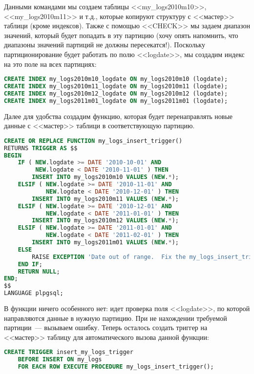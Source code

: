Данными командами мы создаем таблицы <<my\_logs2010m10>>, <<my\_logs2010m11>> и т.д., которые копируют структуру с <<мастер>> 
таблици (кроме индексов). Также с помощью <<CHECK>> мы задаем диапазон значений, который будет попадать в эту партицию 
(хочу опять напомнить, что диапазоны значений партиций не должны пересекатся!). Поскольку партиционирование будет работать 
по полю <<logdate>>, мы создадим индекс на это поле на всех партициях:
\begin{lstlisting}[language=SQL,label=lst:partitioning4,caption=Создание индексов]
CREATE INDEX my_logs2010m10_logdate ON my_logs2010m10 (logdate);
CREATE INDEX my_logs2010m11_logdate ON my_logs2010m11 (logdate);
CREATE INDEX my_logs2010m12_logdate ON my_logs2010m12 (logdate);
CREATE INDEX my_logs2011m01_logdate ON my_logs2011m01 (logdate);
\end{lstlisting}

Далее для удобства создадим функцию, которая будет перенаправлять новые данные с <<мастер>> таблици в соответствующую партицию.
\begin{lstlisting}[language=SQL,label=lst:partitioning5,caption=Функция для перенаправления]
CREATE OR REPLACE FUNCTION my_logs_insert_trigger()
RETURNS TRIGGER AS $$
BEGIN
    IF ( NEW.logdate >= DATE '2010-10-01' AND
         NEW.logdate < DATE '2010-11-01' ) THEN
        INSERT INTO my_logs2010m10 VALUES (NEW.*);
    ELSIF ( NEW.logdate >= DATE '2010-11-01' AND
            NEW.logdate < DATE '2010-12-01' ) THEN
        INSERT INTO my_logs2010m11 VALUES (NEW.*);
    ELSIF ( NEW.logdate >= DATE '2010-12-01' AND
            NEW.logdate < DATE '2011-01-01' ) THEN
        INSERT INTO my_logs2010m12 VALUES (NEW.*);
    ELSIF ( NEW.logdate >= DATE '2011-01-01' AND
            NEW.logdate < DATE '2011-02-01' ) THEN
        INSERT INTO my_logs2011m01 VALUES (NEW.*);
    ELSE
        RAISE EXCEPTION 'Date out of range.  Fix the my_logs_insert_trigger() function!';
    END IF;
    RETURN NULL;
END;
$$
LANGUAGE plpgsql;
\end{lstlisting}

В функции ничего особенного нет: идет проверка поля <<logdate>>, по которой направляются данные в нужную партицию. 
При не нахождении требуемой партиции~--- вызываем ошибку. Теперь осталось создать триггер на <<мастер>> таблицу 
для автоматического вызова данной функции:
\begin{lstlisting}[language=SQL,label=lst:partitioning6,caption=Триггер]
CREATE TRIGGER insert_my_logs_trigger
    BEFORE INSERT ON my_logs
    FOR EACH ROW EXECUTE PROCEDURE my_logs_insert_trigger();
\end{lstlisting}

